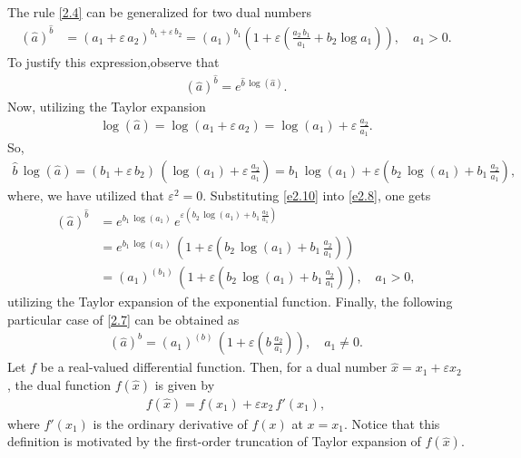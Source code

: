 \documentclass[11pt,a4paper,fleqn]{article}
\numberwithin{equation}{section}
\numberwithin{lemma}{section}
\numberwithin{theorem}{section}
\numberwithin{corollary}{section}
\begin{document}
The rule \eqref{2.4} can be generalized for two dual numbers 
\begin{align} 
	(\widehat{a})^{\widehat{b}} & = (a_1 + \varepsilon \, a_2)^{b_1 + \varepsilon \, b_2} = (a_1)^{b_1} \left(1 + \varepsilon \left(\frac{a_2 \, b_1}{a_1} +  b_2 \log a_1\right)\right), \quad a_1 > 0.\label{2.7}
\end{align} 
 To justify this expression,observe that
 \begin{align}
 (\widehat{a})^{\widehat{b}} = e^{\widehat{b} \, \log (\widehat{a})}. \label{e2.8}
 \end{align}
Now, utilizing the Taylor expansion
\begin{align}
\log (\widehat{a}) = \log (a_1 + \varepsilon \, a_2) = \log (a_1) + \varepsilon \, \frac{a_2}{a_1}. \label{e2.9}
\end{align}
So, 
\begin{align}
\widehat{b} \, \log (\widehat{a}) = (b_1 + \varepsilon \, b_2) \, \left(\log (a_1) + \varepsilon \, \frac{a_2}{a_1}\right) = b_1 \, \log (a_1) + \varepsilon \left(b_2 \, \log (a_1) + b_1 \, \frac{a_2}{a_1}\right),\label{e2.10}
\end{align}
where, we have utilized that $\varepsilon^2 = 0$. Substituting \eqref{e2.10} into \eqref{e2.8}, one gets
\begin{align}
(\widehat{a})^{\widehat{b}} & = e^{b_1 \, \log (a_1)} \, e^{\varepsilon \left(b_2 \, \log (a_1) + b_1 \, \frac{a_2}{a_1}\right)} \nonumber\\
& = e^{b_1 \, \log (a_1)} \, \left(1 + \varepsilon \left(b_2 \, \log (a_1) + b_1 \, \frac{a_2}{a_1}\right)\right)\nonumber\\
& = (a_1)^{(b_1)} \, \left(1 + \varepsilon \left(b_2 \, \log (a_1) + b_1 \, \frac{a_2}{a_1}\right)\right), \quad a_1 > 0,
\end{align}
utilizing the Taylor expansion of the exponential function. Finally, the following particular case of \eqref{2.7} can be obtained as
\begin{align}
	(\widehat{a})^{{b}}  = (a_1)^{(b)} \, \left(1 + \varepsilon \left(b \, \frac{a_2}{a_1}\right)\right), \quad a_1 \ne 0.
\end{align}
Let $f$ be a real-valued differential function. Then, for a dual number $\widehat{x} = x_1 + \varepsilon x_2$, the dual function $f(\widehat{x})$ is given by 
\begin{align*}
f(\widehat{x}) = f(x_1) + \varepsilon x_2 \, f'(x_1),
\end{align*}
where $f'(x_1)$ is the ordinary derivative of $f(x)$ at $x = x_1$. Notice that this definition is motivated by the first-order truncation of Taylor expansion of $f(\widehat{x})$.
\end{document}
